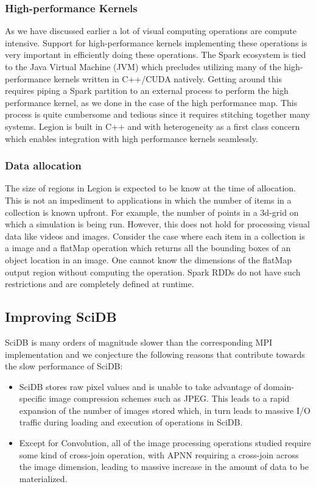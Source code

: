 \documentclass[tog]{acmsiggraph}
\begin{document}
\subsubsection{High-performance Kernels}
As we have discussed earlier a lot of visual computing operations are compute
intensive. Support for high-performance kernels implementing these operations is
very important in efficiently doing these operations. The Spark ecosystem is
tied to the Java Virtual Machine (JVM) which precludes utilizing many of the
high-performance kernels written in C++/CUDA natively. Getting around this
requires piping a Spark partition to an external process to  perform the
high performance kernel, as we done in the case of the high performance map.
This process is quite cumbersome and tedious since it requires stitching
together many systems. Legion is built in C++ and with heterogeneity as a first
class concern which enables integration with high performance kernels
seamlessly.

\subsubsection{Data allocation}
The size of regions in Legion is expected to be know at the time of allocation.
This is not an impediment to applications in which the number of items in a
collection is known upfront. For example, the number of points in a 3d-grid on
which a simulation is being run. However, this does not hold for processing
visual data like videos and images. Consider the case where each item in a
collection is a image and a flatMap operation which returns all the bounding
boxes of an object location in an image. One cannot know the dimensions of the
flatMap output region without computing the operation. Spark RDDs do not have
such restrictions and are completely defined at runtime.


\subsection{Improving SciDB}
SciDB is many orders of magnitude slower than the corresponding MPI
implementation and we conjecture the following reasons that contribute towards
the slow performance of SciDB:

\begin{itemize}
\item SciDB stores raw pixel values and is unable to take advantage of
domain-specific image compression schemes such as JPEG. This leads to a rapid
expansion of the number of images stored which, in turn leads to massive I/O
traffic during loading and execution of operations in SciDB.
\item Except for Convolution, all of the image processing operations studied
require some kind of cross-join operation, with APNN requiring a cross-join
across the image dimension, leading to massive increase in the amount of data
to be materialized.
\end{itemize}
\end{document}
